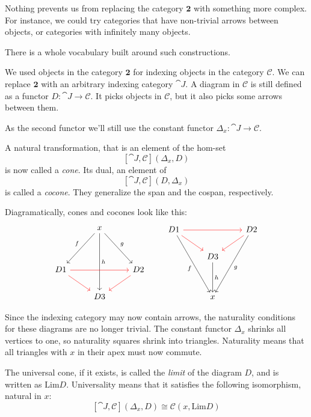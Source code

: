 \documentclass[DaoFP]{subfiles}
\begin{document}
Nothing prevents us from replacing the category $\mathbf{2}$ with something more complex. For instance, we could try categories that have non-trivial arrows between objects, or categories with infinitely many objects. 

There is a whole vocabulary built around such constructions. 

We used objects in the category $\mathbf{2}$ for indexing objects in the category $\mathcal{C}$. We can replace $\mathbf{2}$ with an arbitrary indexing category $\cat J$. A diagram in $\mathcal{C}$ is still defined as a functor $D \colon \cat J \to \mathcal{C}$. It picks objects in $\mathcal{C}$, but it also picks some arrows between them.

As the second functor we'll still use the constant functor $\Delta_x \colon \cat J \to \mathcal{C}$.

A  natural transformation, that is an element of the hom-set
\[ [\cat J, \mathcal{C}](\Delta_x, D)  \]
is now called a \emph{cone}. Its dual, an element of
\[ [\cat J, \mathcal{C}](D, \Delta_x)  \]
is called a \emph{cocone}. They generalize the span and the cospan, respectively.

Diagramatically, cones and cocones look like this:
\[
 \begin{tikzcd}
  & x
\arrow[ddr, "g"]
 \arrow[ddl, "f"']
 \arrow[ddd, "h"]
 \\
\\
D 1 
\arrow[rr, red]
\arrow[rd, red]
&& D 2
\arrow[dl, red]
\\
& D 3
 \end{tikzcd}
 \qquad
\begin{tikzcd}
 D 1
 \arrow[rr, red]
 \arrow[dr, red]
 \arrow[dddr, "f"']
 && D 2
\arrow[dl, red]
 \arrow[dddl, "g"]
 \\
 & D 3
 \arrow[dd, "h"]
 \\
 \\
 & x
 \end{tikzcd}
 \]

Since the indexing category may now contain arrows, the naturality conditions for these diagrams are no longer trivial. The constant functor $\Delta_x$ shrinks all vertices to one, so naturality squares shrink into triangles. Naturality means that all triangles with $x$ in their apex must now commute. 

The universal cone, if it exists, is called the \emph{limit} of the diagram $D$, and is written as $\text{Lim}D$. Universality means that it satisfies the following isomorphism, natural in $x$:
\[ [\cat J, \mathcal{C}](\Delta_x, D)  \cong \mathcal{C}(x, \text{Lim}D) \]
\end{document}

